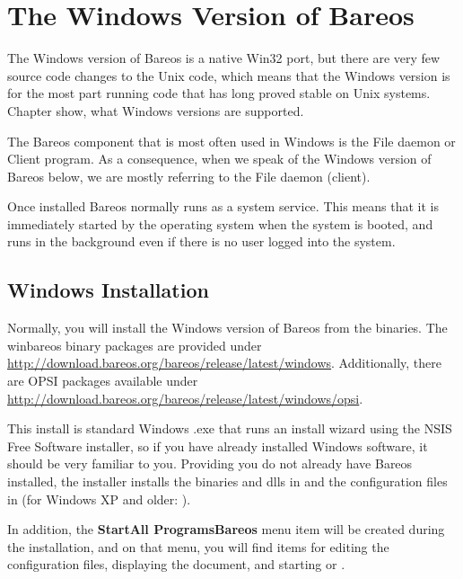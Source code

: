
\chapter{The Windows Version of Bareos}
\label{Win32Chapter}

The Windows version of Bareos is a native Win32 port, but there
are very few source code changes to the Unix code, which means that the
Windows version is for the most part running code that has long proved
stable on Unix systems. Chapter  show, what Windows versions are supported.

The Bareos component that is most often used in Windows 
is the File daemon or Client program. 
As a consequence, when we
speak of the Windows version of Bareos below, we are mostly referring to
the File daemon (client).

Once installed Bareos normally runs as a system service. This means that it is
immediately started by the operating system when the system is booted, and
runs in the background even if there is no user logged into the system.

\section{Windows Installation}
\label{Windows:Installation}
\label{Windows:Configuration:Files}

Normally, you will install the Windows version of Bareos from the binaries.
The winbareos binary packages are provided under \url{http://download.bareos.org/bareos/release/latest/windows}.
Additionally, there are OPSI packages available under \url{http://download.bareos.org/bareos/release/latest/windows/opsi}.

This install is standard Windows .exe that runs an install wizard using the
NSIS Free Software installer, so if you have already installed Windows
software, it should be very familiar to you.
Providing you do not already
have Bareos installed, the installer installs the binaries and dlls in
 and the configuration files
in  (for Windows XP and older: ).

In addition, the {\bf Start\-{\textgreater}All Programs\-{\textgreater}Bareos} menu item
will be created during the installation, and on that menu, you
will find items for editing the configuration files, displaying
the document, and starting  or .


